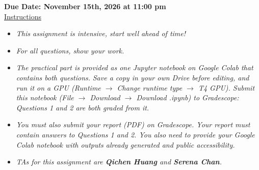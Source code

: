 \documentclass[12pt]{article}
\theoremstyle{definition}
\begin{document}
\fancyhead{}
\fancyfoot{}


\vspace{1cm}

\shorthandoff{:}
{\textbf{Due Date: November 15th, 2026 at 11:00 pm}}\\


\vspace{-0.5cm}
\underline{Instructions}%
\renewcommand{\labelitemi}{\textbullet}

\renewcommand{\labelitemi}{\textbullet}

\begin{itemize}
\item \emph{This assignment is intensive, start well ahead of time!}
\item \emph{For all questions, show your work.}
\item \emph{The practical part is provided as one Jupyter notebook on Google Colab that contains both questions.} \emph{Save a
copy in your own Drive before editing, and run it on a GPU (Runtime $\rightarrow$ Change runtime type $\rightarrow$ T4
GPU). Submit this notebook (File $\rightarrow$ Download $\rightarrow$ Download .ipynb) to Gradescope:
Questions 1 and 2 are both graded from it.}
\item \emph{You must also submit your report (PDF) on Gradescope. Your report must contain answers to Questions 1 and 2. You also need to provide your Google Colab notebook with outputs already generated and public accessibility.}
\item \emph{TAs for this assignment are \textbf{Qichen Huang} and \textbf{Serena Chan}.}
\end{itemize}
\vspace{0.2cm}
\end{document}
